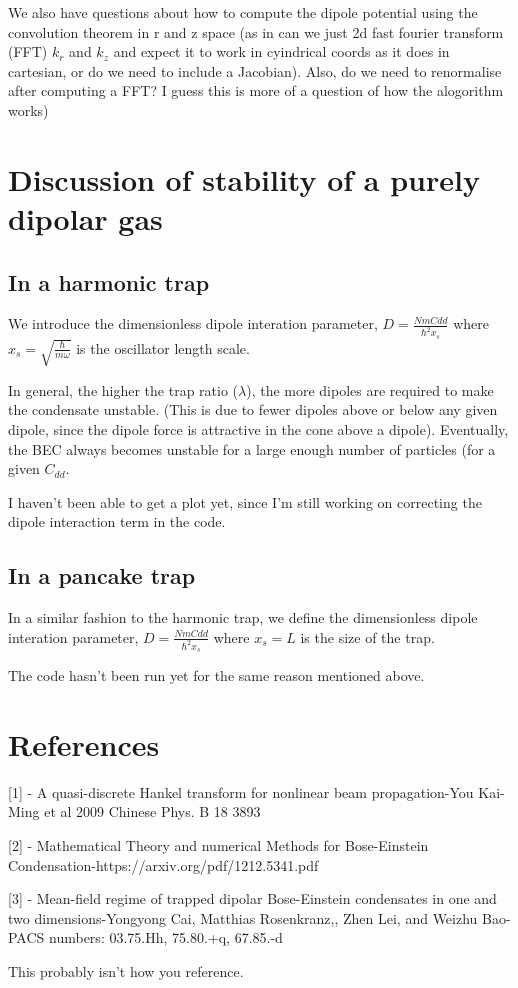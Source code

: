 \documentclass[12pt]{article}
\begin{document}
We also have questions about how to compute the dipole potential using the convolution theorem in r and z space (as in can we just 2d fast fourier transform (FFT) $k_{r}$ and $k_{z}$ and expect it to work in cyindrical coords as it does in cartesian, or do we need to include a Jacobian).
Also, do we need to renormalise after computing a FFT? I guess this is more of a question of how the alogorithm works)


\section{Discussion of stability of a purely dipolar gas}

\subsection{In a harmonic trap}

We introduce the dimensionless dipole interation parameter, $D=\frac{NmCdd}{\hbar^{2}x_{s}}$ where $ x_{s} =\sqrt{\frac{\hbar}{m\omega}}$ is the oscillator length scale.

In general, the higher the trap ratio ($\lambda$), the more dipoles are required to make the condensate unstable. (This is due to fewer dipoles above or below any given dipole, since the dipole force is attractive in the cone above a dipole). Eventually, the BEC always becomes unstable for a large enough number of particles (for a given $C_{dd}$.

I haven't been able to get a plot yet, since I'm still working on correcting the dipole interaction term in the code.

\subsection{In a pancake trap}

 In a similar fashion to the harmonic trap, we define the dimensionless dipole interation parameter, $D=\frac{NmCdd}{\hbar^{2}x_{s}}$ where $ x_{s} =L$ is the size of the trap.
 
 The code hasn't been run yet for the same reason mentioned above.


\section{References}
[1] - A quasi-discrete Hankel transform for nonlinear beam propagation-You Kai-Ming et al 2009 Chinese Phys. B 18 3893

[2] - Mathematical Theory and numerical Methods for Bose-Einstein Condensation-https://arxiv.org/pdf/1212.5341.pdf

[3] - Mean-field regime of trapped dipolar Bose-Einstein condensates in one and two dimensions-Yongyong Cai, Matthias Rosenkranz,, Zhen Lei, and Weizhu Bao-PACS numbers: 03.75.Hh, 75.80.+q, 67.85.-d 
 

This probably isn't how you reference.
\end{document}
